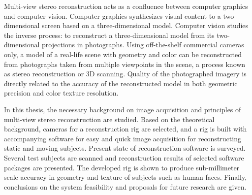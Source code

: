 \begin{abstractpage}[english]
Multi-view stereo reconstruction acts as a confluence between computer graphics and computer vision.
Computer graphics synthesizes visual content to a two-dimensional screen based on a three-dimensional model.
Computer vision studies the inverse process: to reconstruct a three-dimensional model from its two-dimensional projections in photographs.
Using off-the-shelf commercial cameras only, a model of a real-life scene with geometry and color can be reconstructed from photographs taken from multiple viewpoints in the scene, a process known as stereo reconstruction or 3D scanning.
Quality of the photographed imagery is directly related to the accuracy of the reconstructed model in both geometric precision and color texture resolution.

In this thesis, the necessary background on image acquisition and principles of multi-view stereo reconstruction are studied.
Based on the theoretical background, cameras for a reconstruction rig are selected, and a rig is built with accompanying software for easy and quick image acquisition for reconstructing static and moving subjects.
Present state of reconstruction software is surveyed.
Several test subjects are scanned and reconstruction results of selected software packages are presented.
The developed rig is shown to produce sub-millimeter scale accuracy in geometry and texture of subjects such as human faces.
Finally, conclusions on the system feasibility and proposals for future research are given.
\end{abstractpage}

\newpage

\keywords{}
\begin{abstractpage}[finnish]
\end{abstractpage}
